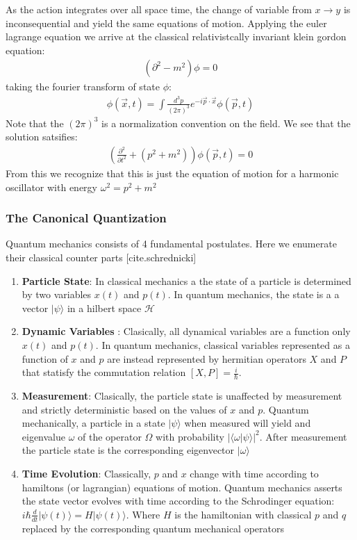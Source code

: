As the action integrates over all space time, the change of variable from $x\rightarrow y$ is
inconsequential and yield the same equations of  motion.
Applying the euler lagrange equation we arrive at the 
classical relativistcally invariant klein gordon equation:
\begin{align*}
(\partial^2 - m^2 ) \phi = 0
\end{align*}
taking the fourier transform of state $\phi$:
\begin{align*}
\phi(\vec x, t) = \int \frac{d^3p}{(2\pi)^3} e^{-i \vec p \cdot \vec x } \phi (\vec p, t)
\end{align*}
Note that the $(2\pi)^3$ is a normalization convention on the field. We see that the solution satsifies:
\begin{align*}
\left( \frac{\partial^2 }{\partial t^2} + (p^2 + m^2) \right ) \phi(\vec p, t)= 0
\end{align*}
From this we recognize that this is just the equation of motion for
 a harmonic oscillator with energy $\omega^2 = p^2 + m^2$

\subsubsection{The Canonical Quantization}

Quantum mechanics consists of 4 fundamental postulates. Here we enumerate their classical counter parts [cite.schrednicki]

\begin{enumerate}
\item \textbf{Particle State}: In classical mechanics a the state of a particle is determined by two variables $x(t)$ and $p(t)$. In quantum mechanics, the state is a a vector $|\psi \rangle$ in a hilbert space $\mathcal{H}$
\item \textbf{Dynamic Variables }: Clasically, all dynamical variables are a
 function only $x(t)$ and $p(t)$. In quantum mechanics, classical variables 
represented as a function of $x$ and $p$ are instead 
represented by hermitian operators $X$ and $P$ that statisfy the commutation 
relation $[X,P] = \frac{i}\hbar$. 
\item \textbf{Measurement}: Clasically, the particle state is unaffected by measurement and strictly
deterministic based on the values of $x$ and $p$. Quantum mechanically, a particle in a state $|\psi \rangle$ when measured will yield and eigenvalue $\omega$ of the operator $\Omega$ with probability
$|\langle\omega|\psi \rangle|^2$. After measurement the particle state is the corresponding eigenvector  $|\omega\rangle$
\item \textbf{Time Evolution}: Classically, $p$ and $x$ change with time according to hamiltons (or lagrangian) equations of motion. Quantum mechanics asserts the state vector evolves with time according to the
Schrodinger equation: $i \hbar \frac{d}{dt}|\psi(t) \rangle = H | \psi(t) \rangle$. Where $H$ is the 
hamiltonian with classical $p$ and $q$ replaced by the corresponding quantum mechanical operators
\end{enumerate}

